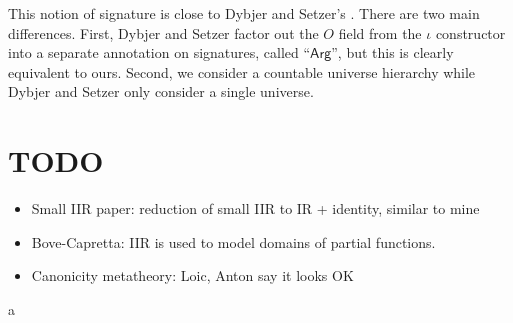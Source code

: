 \documentclass[acmsmall,screen,review,anonymous]{acmart}
\newcommand{\msf}[1]{{\mathsf{#1}}}
\begin{document}
This notion of signature is close to Dybjer and Setzer's \cite{TODO}. There are two main differences.
First, Dybjer and Setzer factor out the $O$ field from the $\iota$ constructor into a separate annotation
on signatures, called ``$\msf{Arg}$'', but this is clearly equivalent to ours. Second, we consider a countable
universe hierarchy while Dybjer and Setzer only consider a single universe.








\section{TODO}

\begin{itemize}
  \item Small IIR paper: reduction of small IIR to IR + identity, similar to mine
  \item Bove-Capretta: IIR is used to model domains of partial functions.
  \item Canonicity metatheory: Loic, Anton say it looks OK
\end{itemize}a











\end{document}

